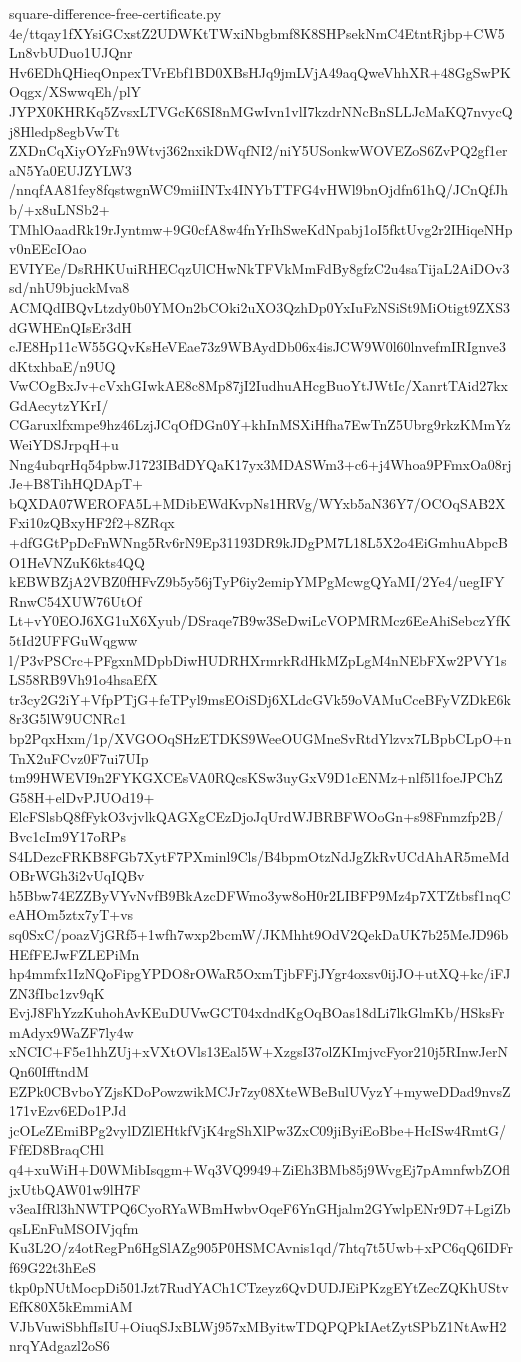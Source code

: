 \documentclass[11pt]{article}
\theoremstyle{definition}
\theoremstyle{remark}
\begin{document}
\begin{filecontents*}[overwrite]{square-difference-free-certificate.py}
4e/ttqay1fXYsiGCxstZ2UDWKtTWxiNbgbmf8K8SHPsekNmC4EtntRjbp+CW5Ln8vbUDuo1UJQnr
Hv6EDhQHieqOnpexTVrEbf1BD0XBsHJq9jmLVjA49aqQweVhhXR+48GgSwPKOqgx/XSwwqEh/plY
JYPX0KHRKq5ZvsxLTVGcK6SI8nMGwIvn1vlI7kzdrNNcBnSLLJcMaKQ7nvycQj8Hledp8egbVwTt
ZXDnCqXiyOYzFn9Wtvj362nxikDWqfNI2/niY5USonkwWOVEZoS6ZvPQ2gf1eraN5Ya0EUJZYLW3
/nnqfAA81fey8fqstwgnWC9miiINTx4INYbTTFG4vHWl9bnOjdfn61hQ/JCnQfJhb/+x8uLNSb2+
TMhlOaadRk19rJyntmw+9G0cfA8w4fnYrIhSweKdNpabj1oI5fktUvg2r2IHiqeNHpv0nEEcIOao
EVIYEe/DsRHKUuiRHECqzUlCHwNkTFVkMmFdBy8gfzC2u4saTijaL2AiDOv3sd/nhU9bjuckMva8
ACMQdIBQvLtzdy0b0YMOn2bCOki2uXO3QzhDp0YxIuFzNSiSt9MiOtigt9ZXS3dGWHEnQIsEr3dH
cJE8Hp11cW55GQvKsHeVEae73z9WBAydDb06x4isJCW9W0l60lnvefmIRIgnve3dKtxhbaE/n9UQ
VwCOgBxJv+cVxhGIwkAE8c8Mp87jI2IudhuAHcgBuoYtJWtIc/XanrtTAid27kxGdAecytzYKrI/
CGaruxlfxmpe9hz46LzjJCqOfDGn0Y+khInMSXiHfha7EwTnZ5Ubrg9rkzKMmYzWeiYDSJrpqH+u
Nng4ubqrHq54pbwJ1723IBdDYQaK17yx3MDASWm3+c6+j4Whoa9PFmxOa08rjJe+B8TihHQDApT+
bQXDA07WEROFA5L+MDibEWdKvpNs1HRVg/WYxb5aN36Y7/OCOqSAB2XFxi10zQBxyHF2f2+8ZRqx
+dfGGtPpDcFnWNng5Rv6rN9Ep31193DR9kJDgPM7L18L5X2o4EiGmhuAbpcBO1HeVNZuK6kts4QQ
kEBWBZjA2VBZ0fHFvZ9b5y56jTyP6iy2emipYMPgMcwgQYaMI/2Ye4/uegIFYRnwC54XUW76UtOf
Lt+vY0EOJ6XG1uX6Xyub/DSraqe7B9w3SeDwiLcVOPMRMcz6EeAhiSebczYfK5tId2UFFGuWqgww
l/P3vPSCrc+PFgxnMDpbDiwHUDRHXrmrkRdHkMZpLgM4nNEbFXw2PVY1sLS58RB9Vh91o4hsaEfX
tr3cy2G2iY+VfpPTjG+feTPyl9msEOiSDj6XLdcGVk59oVAMuCceBFyVZDkE6k8r3G5lW9UCNRc1
bp2PqxHxm/1p/XVGOOqSHzETDKS9WeeOUGMneSvRtdYlzvx7LBpbCLpO+nTnX2uFCvz0F7ui7UIp
tm99HWEVI9n2FYKGXCEsVA0RQcsKSw3uyGxV9D1cENMz+nlf5l1foeJPChZG58H+elDvPJUOd19+
ElcFSlsbQ8fFykO3vjvlkQAGXgCEzDjoJqUrdWJBRBFWOoGn+s98Fnmzfp2B/Bvc1cIm9Y17oRPs
S4LDezcFRKB8FGb7XytF7PXminl9Cls/B4bpmOtzNdJgZkRvUCdAhAR5meMdOBrWGh3i2vUqIQBv
h5Bbw74EZZByVYvNvfB9BkAzcDFWmo3yw8oH0r2LIBFP9Mz4p7XTZtbsf1nqCeAHOm5ztx7yT+vs
sq0SxC/poazVjGRf5+1wfh7wxp2bcmW/JKMhht9OdV2QekDaUK7b25MeJD96bHEfFEJwFZLEPiMn
hp4mmfx1IzNQoFipgYPDO8rOWaR5OxmTjbFFjJYgr4oxsv0ijJO+utXQ+kc/iFJZN3fIbc1zv9qK
EvjJ8FhYzzKuhohAvKEuDUVwGCT04xdndKgOqBOas18dLi7lkGlmKb/HSksFrmAdyx9WaZF7ly4w
xNCIC+F5e1hhZUj+xVXtOVls13Eal5W+XzgsI37olZKImjvcFyor210j5RInwJerNQn60IfftndM
EZPk0CBvboYZjsKDoPowzwikMCJr7zy08XteWBeBulUVyzY+myweDDad9nvsZ171vEzv6EDo1PJd
jcOLeZEmiBPg2vylDZlEHtkfVjK4rgShXlPw3ZxC09jiByiEoBbe+HcISw4RmtG/FfED8BraqCHl
q4+xuWiH+D0WMibIsqgm+Wq3VQ9949+ZiEh3BMb85j9WvgEj7pAmnfwbZOfljxUtbQAW01w9lH7F
v3eaIfRl3hNWTPQ6CyoRYaWBmHwbvOqeF6YnGHjalm2GYwlpENr9D7+LgiZbqsLEnFuMSOIVjqfm
Ku3L2O/z4otRegPn6HgSlAZg905P0HSMCAvnis1qd/7htq7t5Uwb+xPC6qQ6IDFrf69G22t3hEeS
tkp0pNUtMocpDi501Jzt7RudYACh1CTzeyz6QvDUDJEiPKzgEYtZecZQKhUStvEfK80X5kEmmiAM
VJbVuwiSbhfIsIU+OiuqSJxBLWj957xMByitwTDQPQPkIAetZytSPbZ1NtAwH2nrqYAdgazl2oS6

\end{filecontents*}
\end{document}
